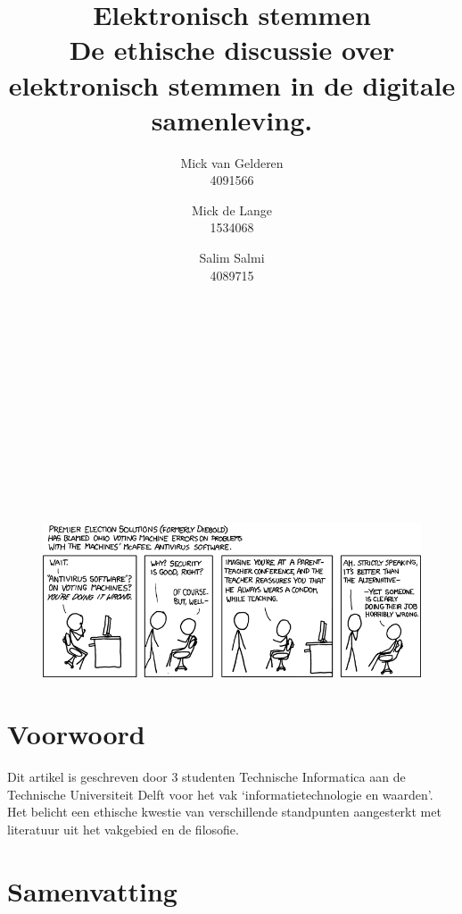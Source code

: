 \documentclass[a4paper]{article}
\title{Elektronisch stemmen \\ \large De ethische discussie over elektronisch stemmen in de digitale samenleving.}
\author{
Mick van Gelderen \\ 4091566 \and 
Mick de Lange \\ 1534068 \and
Salim Salmi \\ 4089715
}
\begin{document}
\maketitle

\hfill \\ \\ \\ \\ \\ \\ \\ \\ \\ \\
\begin{figure}[htp]
	\centering
	\includegraphics[width=\textwidth]{media/voting_machines.png}
	\label{fig:voting-machines}

\end{figure}

\thispagestyle{empty}
\newpage

\section*{Voorwoord}
Dit artikel is geschreven door 3 studenten Technische Informatica aan de Technische Universiteit Delft voor het vak `informatietechnologie en waarden'.
Het belicht een ethische kwestie van verschillende standpunten aangesterkt met literatuur uit het vakgebied en de filosofie. 

\section*{Samenvatting}


\thispagestyle{empty}
\newpage

\renewcommand{\contentsname}{Inhoud} 
\tableofcontents
\end{document}
